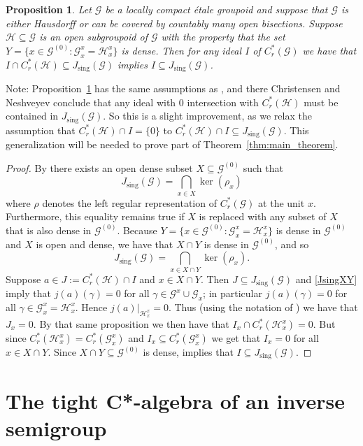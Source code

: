 \documentclass[12pt]{amsart}
\newtheorem{prop}[thm]{Proposition}
\theoremstyle{definition}
\theoremstyle{remark}
\numberwithin{equation}{section}
\renewcommand{\H}{\mathcal{H}}
\newcommand{\go}{\g^{(0)}}
\newcommand{\g}{\mathcal{G}}
\newcommand{\Js}{J_{\text{sing}}}
\begin{document}
	\begin{prop}\label{prop:CN47generalization}
		Let $\g$ be a locally compact \'etale groupoid and suppose that $\g$ is either Hausdorff or can be covered by countably many open bisections. Suppose $\H\subseteq \g$ is an open subgroupoid of $\g$ with the property that the set $Y = \{x\in \go: \g^x_x = \H_x^x\}$ is dense. Then for any ideal $I$ of $C^*_r(\g)$ we have that $I\cap C^*_r(\H)\subseteq \Js(\g)$ implies $I\subseteq \Js(\g)$. 
	\end{prop}
	Note: Proposition~\ref{prop:CN47generalization} has the same assumptions as \cite[Theorem~4.7]{CN24}, and there Christensen and Neshveyev conclude that any ideal with 0 intersection with $C^*_r(\H)$ must be contained in $\Js(\g)$. So this is a slight improvement, as we relax the assumption that $C_r^*(\H)\cap I = \{0\}$ to $C_r^*(\H)\cap I\subseteq\Js(\g)$. This generalization will be needed to prove part of Theorem~\ref{thm:main_theorem}.
	\begin{proof}
		By \cite[Section 4]{CN24} there exists an open dense subset $X\subseteq \go$ such that 
		\begin{equation}\label{JsingDef}
			\Js(\g) = \bigcap_{x\in X}\ker(\rho_x)
		\end{equation}
		where $\rho$ denotes the left regular representation of $C_r^*(\g)$ at the unit $x$. Furthermore, this equality remains true if $X$ is replaced with any subset of $X$ that is also dense in $\go$. Because $Y = \{x\in \go: \g^x_x = \H_x^x\}$ is dense in $\go$ and $X$ is open and dense, we have that $X\cap Y$ is dense in $\go$, and so 
		\begin{equation}\label{JsingXY}
			\Js(\g) = \bigcap_{x\in X\cap Y}\ker(\rho_x).
		\end{equation}
		Suppose $a\in J:= C_r^*(\H)\cap I$ and $x\in X\cap Y$. Then $J\subseteq \Js(\g)$ and \eqref{JsingXY} imply that $j(a)(\gamma) = 0$ for all $\gamma\in \g^x\cup \g_x$; in particular $j(a)(\gamma) = 0$ for all $\gamma\in \g_x^x = \H^x_x$. Hence $\left.j(a)\right|_{\H^x_x} = 0$. Thus (using the notation of \cite[Proposition~4.6]{CN24}) we have that $J_x = 0$. By that same proposition we then have that $I_x \cap C^*_r(\H_x^x) = 0$. But since $C^*_r(\H_x^x) = C^*_r(\g_x^x)$ and $I_x \subseteq C^*_r(\g_x^x)$ we get that $I_x = 0$ for all $x\in X\cap Y$. Since $X\cap Y\subseteq \go$ is dense, \cite[Lemma~4.1]{CN24} implies that $I\subseteq \Js(\g)$.  
	\end{proof}
	
	\section{The tight C*-algebra of an inverse semigroup}
	
\end{document}
